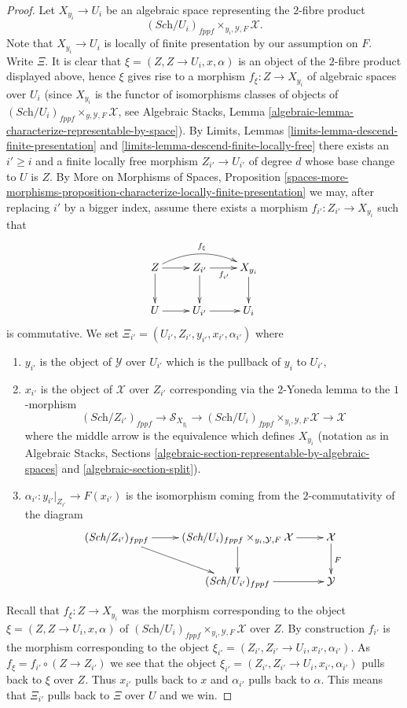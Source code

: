 \begin{proof}
\medskip\noindent
Let $X_{y_i} \to U_i$ be an algebraic space representing the $2$-fibre
product
$$
(\textit{Sch}/U_i)_{fppf} \times_{y_i, \mathcal{Y}, F} \mathcal{X}.
$$
Note that $X_{y_i} \to U_i$ is locally of finite presentation by our
assumption on $F$. Write $\Xi $. It is clear that
$\xi = (Z, Z \to U_i, x, \alpha)$ is an object of the $2$-fibre product
displayed above, hence $\xi$ gives rise to a morphism
$f_\xi : Z \to X_{y_i}$ of algebraic spaces over $U_i$
(since $X_{y_i}$ is the functor of isomorphisms classes of objects of
$(\textit{Sch}/U_i)_{fppf} \times_{y, \mathcal{Y}, F} \mathcal{X}$, see
Algebraic Stacks,
Lemma \ref{algebraic-lemma-characterize-representable-by-space}).
By
Limits, Lemmas \ref{limits-lemma-descend-finite-presentation} and
\ref{limits-lemma-descend-finite-locally-free}
there exists an $i' \geq i$ and a finite locally free morphism
$Z_{i'} \to U_{i'}$ of degree $d$ whose base change to $U$ is $Z$. By
More on Morphisms of Spaces, Proposition
\ref{spaces-more-morphisms-proposition-characterize-locally-finite-presentation}
we may, after replacing $i'$ by a bigger index, assume there exists a
morphism $f_{i'} : Z_{i'} \to X_{y_i}$ such that
$$
\xymatrix{
Z \ar[d] \ar[r] \ar@/^3ex/[rr]^{f_\xi} &
Z_{i'} \ar[d] \ar[r]_{f_{i'}} & X_{y_i} \ar[d] \\
U \ar[r] & U_{i'} \ar[r] & U_i
}
$$
is commutative. We set
$\Xi_{i'} = (U_{i'}, Z_{i'}, y_{i'}, x_{i'}, \alpha_{i'})$
where
\begin{enumerate}
\item $y_{i'}$ is the object of $\mathcal{Y}$ over $U_{i'}$
which is the pullback of $y_i$ to $U_{i'}$,
\item $x_{i'}$ is the object of $\mathcal{X}$ over $Z_{i'}$ corresponding
via the $2$-Yoneda lemma to the $1$-morphism
$$
(\textit{Sch}/Z_{i'})_{fppf} \to
\mathcal{S}_{X_{y_i}} \to
(\textit{Sch}/U_i)_{fppf} \times_{y_i, \mathcal{Y}, F} \mathcal{X} \to
\mathcal{X}
$$
where the middle arrow is the equivalence which defines $X_{y_i}$
(notation as in
Algebraic Stacks, Sections
\ref{algebraic-section-representable-by-algebraic-spaces} and
\ref{algebraic-section-split}).
\item $\alpha_{i'} : y_{i'}|_{Z_{i'}} \to F(x_{i'})$ is the isomorphism
coming from the $2$-commutativity of the diagram
$$
\xymatrix{
(\textit{Sch}/Z_{i'})_{fppf} \ar[r] \ar[rd] &
(\textit{Sch}/U_i)_{fppf} \times_{y_i, \mathcal{Y}, F} \mathcal{X}
\ar[r] \ar[d] &
\mathcal{X} \ar[d]^F \\
& (\textit{Sch}/U_{i'})_{fppf} \ar[r] & \mathcal{Y}
}
$$
\end{enumerate}
Recall that $f_\xi : Z \to X_{y_i}$ was the morphism corresponding to
the object $\xi = (Z, Z \to U_i, x, \alpha)$ of
$(\textit{Sch}/U_i)_{fppf} \times_{y_i, \mathcal{Y}, F} \mathcal{X}$
over $Z$. By construction $f_{i'}$ is the morphism corresponding to
the object $\xi_{i'} = (Z_{i'}, Z_{i'} \to U_i, x_{i'}, \alpha_{i'})$.
As $f_\xi = f_{i'} \circ (Z \to Z_{i'})$ we see that
the object $\xi_{i'} = (Z_{i'}, Z_{i'} \to U_i, x_{i'}, \alpha_{i'})$ pulls
back to $\xi$ over $Z$. Thus $x_{i'}$ pulls back to $x$ and $\alpha_{i'}$
pulls back to $\alpha$. This means that $\Xi_{i'}$ pulls back
to $\Xi$ over $U$ and we win.
\end{proof}
